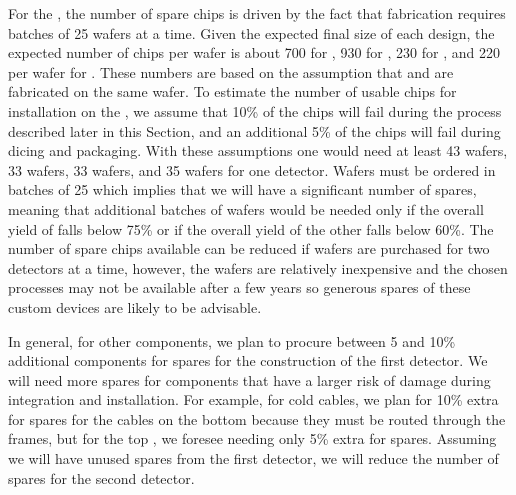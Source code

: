 For the , the number of spare chips is driven by the fact that fabrication
requires batches of 25 wafers at a time. Given the expected final size of each design, the
expected number of chips per wafer is about 700 for , 930 for ,
230 for , and 220 per wafer for . These numbers are based on the
assumption that  and  are fabricated on the same wafer. To
estimate the number of usable chips for installation on the , we assume that
10\% of the chips will fail during the  process described later in this Section,
and an additional 5\% of the chips will fail during dicing and packaging. With these
assumptions one would need at least 43  wafers, 33  wafers,
33  wafers, and 35  wafers for one  detector. Wafers
must be ordered in batches of 25 which implies that we will have a significant number of
spares, meaning that additional batches of wafers would be needed only if the overall
yield of  falls below 75\% or if the overall yield of the other
 falls below 60\%. The number of spare chips available can be reduced if wafers are purchased for two
 detectors at a time, however, the wafers are relatively inexpensive and the chosen
processes may not be available after a few years so generous spares of these custom devices
are likely to be advisable. 

In general, for other components, we plan to procure between 5 and
10\% additional components for spares for the construction of the first 
detector. We will need more spares for components that have
a larger risk of damage during integration and 
installation. For example, for cold cables, we
plan for 10\% extra for spares for the cables on the bottom  because
they must be routed through the  frames, but
for the top , we foresee needing only 5\% extra for spares.
Assuming we will have unused spares from the first detector, we will reduce the number of
spares for the second  detector.


